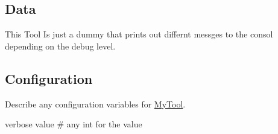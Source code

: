 \subsection*{Data}

This Tool Is just a dummy that prints out differnt messges to the consol depending on the debug level.

\subsection*{Configuration}

Describe any configuration variables for \hyperlink{classMyTool}{My\-Tool}.

verbose value \# any int for the value 